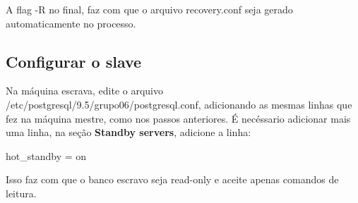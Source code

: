 \documentclass[a4paper,10pt]{article}
\begin{document}
          A flag -R no final, faz com que o arquivo recovery.conf seja gerado automaticamente no processo.

    \subsection{Configurar o slave}
        Na máquina escrava, edite o arquivo /etc/postgresql/9.5/grupo06/postgresql.conf, adicionando as mesmas linhas que fez na máquina mestre, como nos passos anteriores. É necéssario adicionar mais uma linha, na seção \textbf{Standby servers}, adicione a linha:
          \begin{spverbatim}
              hot_standby = on
          \end{spverbatim}

        Isso faz com que o banco escravo seja read-only e aceite apenas comandos de leitura.
\end{document}
